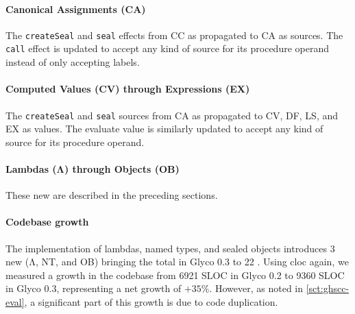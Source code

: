 \documentclass[main.tex]{subfiles}
\begin{document}
\paragraph{Canonical Assignments (CA)} The \texttt{createSeal} and \texttt{seal} effects from CC as propagated to CA as sources. The \texttt{call} effect is updated to accept any kind of source for its procedure operand instead of only accepting labels.

\paragraph{Computed Values (CV) through Expressions (EX)} The \texttt{createSeal} and \texttt{seal} sources from CA as propagated to CV, DF, LS, and EX as values. The evaluate value is similarly updated to accept any kind of source for its procedure operand.

\paragraph{Lambdas (Λ) through Objects (OB)} These new  are described in the preceding sections.

\paragraph{Codebase growth} The implementation of lambdas, named types, and sealed objects introduces 3 new  (Λ, NT, and OB) bringing the total in Glyco 0.3 to 22 . Using cloc again, we measured a growth in the codebase from 6921 SLOC in Glyco 0.2 to 9360 SLOC in Glyco 0.3, representing a net growth of $+35\%$. However, as noted in \cref{sct:ghscc-eval}, a significant part of this growth is due to code duplication.

\onlyinsubfile{\glsaddall\printglossaries}
\end{document}

